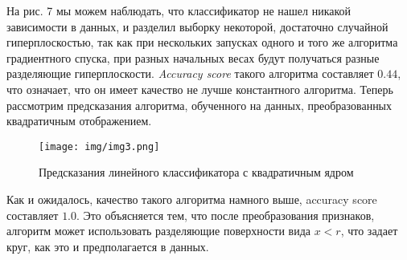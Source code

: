 \documentclass[twoside,twocolumn]{article}
\theoremstyle{plain}
\theoremstyle{definition}
\begin{document}
На рис. 7 мы можем наблюдать, что классификатор не нашел никакой зависимости в данных, и разделил выборку некоторой, достаточно случайной гиперплоскостью,
так как при нескольких запусках одного и того же алгоритма градиентного спуска, при разных начальных весах будут получаться разные разделяющие гиперплоскости.
\emph{Accuracy score} такого алгоритма составляет $0.44$, что означает, что он имеет качество не лучше константного алгоритма.
Теперь рассмотрим предсказания алгоритма, обученного на данных, преобразованных квадратичным отображением.

\begin{figure}[!h]
  \caption{Предсказания линейного классификатора с квадратичным ядром}
  \centering
  \texttt{[image: img/img3.png]}
  \label{fig:circles3}
\end{figure}

Как и ожидалось, качество такого алгоритма намного выше, accuracy score составляет $1.0$. Это объясняется тем, что после преобразования признаков,
алгоритм может использовать разделяющие поверхности вида $x < r$, что задает круг, как это и предполагается в данных.
\end{document}
